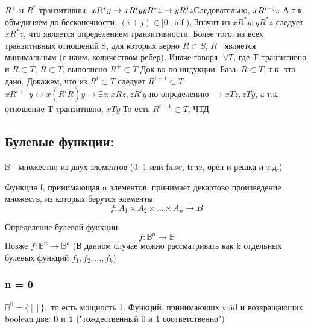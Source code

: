 $R^{+}$ и $R^{*}$ транзитивны:
$ \newline
xR^{*}y \rightarrow xR^{i}y \newline 
yR^{*}z \rightarrow yR^{j}z \newline
$Следовательно, $ xR^{i+j}z \newline 
$ А т.к. объединяем до бесконечности, $(i+j) \in [0; \inf) $, Значит из $ xR^{*}y; yR^{*}z $ следует $ xR^{*}z $, что является определением транзитивности.
Более того, из всех транзитивных отношений S, для которых верно $ R \subset S $, $R^{+}$ является минимальным (с наим. количеством ребер).
Иначе говоря, $\forall T$, где T транзитивно и $R \subset T$, $R \subset T$, выполнено $R^{+} \subset T$ \newline
Док-во по индукции:\newline
База: $R \subset T$, т.к. это дано.\newline
Докажем, что из $ R^{i} \subset T $ следует $ R^{i+1} \subset T $ \newline
$ xR^{i+1}y \leftrightarrow x(R^{i}R)y \rightarrow \exists z: xRz, zR^iy $ по определению \newline
$ \rightarrow xTz, zTy$, а т.к. отношение T транзитивно, $xTy$ \newline То есть $ R^{i+1} \subset T $, ЧТД

\subsection{Булевые функции:}
$ \mathbb{B} $ - множество из двух элементов ({0, 1} или {false, true}, {орёл и решка} и т.д.)

Функция f, принимающая n элементов, принимает декартово произведение множеств, из которых берутся элементы:
\[ f: A_1 \times A_2 \times ... \times A_n \longrightarrow B\]

Определение булевой функции:
\[ f: \mathbb{B}^{n} \longrightarrow \mathbb{B}\]
Позже \( f: \mathbb{B}^{n} \longrightarrow \mathbb{B}^{k}\)
(В данном случае можно рассматривать как k отдельных булевых функций $f_1, f_2, ..., f_k$)

\subsubsection{n = 0}
$ \mathbb{B}^{0} = \{[]\}, $ то есть мощность 1.
Функций, принимающих void и возвращающих boolean две: $\mathbf{0}$ и $\mathbf{1}$ ("тождественный 0 и 1 соответственно") %

